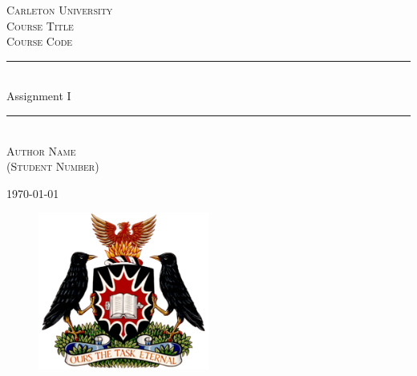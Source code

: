 \documentclass[12pt]{article}
\begin{document}
\begin{titlepage}

  \newcommand{\HRule}{\rule{\linewidth}{0.5mm}} %


\center %


\textsc{\LARGE Carleton University}\\[1.5cm] %
\textsc{\Large Course Title}\\[0.5cm] %
\textsc{\large Course Code}\\[0.5cm] %


\HRule \\[0.4cm]
{Assignment I}\\[0.4cm] %
\HRule \\[1.5cm]


\textsc{Author Name \\ (Student Number)} %


{\large \today}\\[2cm] %

\begin{figure}
\centering
\includegraphics[width=0.5\textwidth]{logo.png}
\end{figure}
\vfill %
\end{titlepage}
\normalsize
\tableofcontents
\newpage

\end{document}
